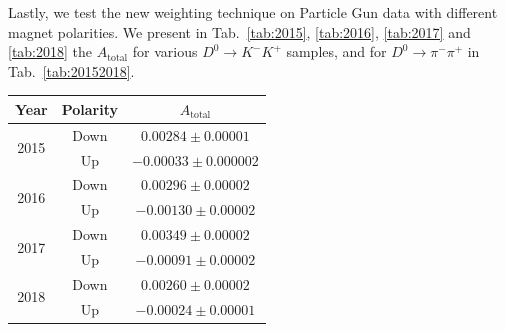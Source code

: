 \documentclass{article}
\begin{document}
        Lastly, we test the new weighting technique on Particle Gun data with different magnet polarities.
        We present in Tab.~\ref{tab:2015}, \ref{tab:2016}, \ref{tab:2017} and \ref{tab:2018} the $A_\text{total}$ for various $D^0\to K^-K^+$ samples, and for $D^0\to \pi^-\pi^+$ in Tab.~\ref{tab:20152018}.
        \begin{center}
                \begin{tabular}{c|c|c}
                        Year & Polarity & $A_\text{total}$\\
                        \hline\hline
                        \multirow{2}{*}{2015} & Down & $0.00284 \pm 0.00001$\\
                        \cline{2-3}
                        & Up & $-0.00033\pm 0.000002$\\
                        \hline
                        \multirow{2}{*}{2016} & Down & $0.00296\pm 0.00002$\\
                        \cline{2-3}
                        & Up & $-0.00130\pm 0.00002$\\
                        \hline
                        \multirow{2}{*}{2017} & Down & $0.00349\pm 0.00002$\\
                        \cline{2-3}
                        & Up & $-0.00091\pm 0.00002$\\
                        \hline
                        \multirow{2}{*}{2018} & Down & $0.00260\pm 0.00002$\\
                        \cline{2-3}
                        & Up & $-0.00024\pm 0.00001$\\
                \end{tabular}
                \label{tab:20152018}
        \end{center}
\end{document}
